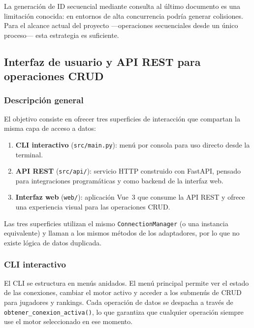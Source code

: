 \documentclass[12pt,letterpaper]{article}
\begin{document}
La generación de ID secuencial mediante consulta al último documento es una limitación
conocida: en entornos de alta concurrencia podría generar colisiones. Para el alcance actual
del proyecto ---operaciones secuenciales desde un único proceso--- esta estrategia es
suficiente.

\subsection{Interfaz de usuario y API REST para operaciones CRUD}

\subsubsection{Descripción general}

El objetivo consiste en ofrecer tres superficies de interacción que compartan
la misma capa de acceso a datos:

\begin{enumerate}[leftmargin=2em]
  \item \textbf{CLI interactivo} (\texttt{src/main.py}): menú por consola para uso directo
        desde la terminal.
  \item \textbf{API REST} (\texttt{src/api/}): servicio HTTP construido con FastAPI, pensado
        para integraciones programáticas y como backend de la interfaz web.
  \item \textbf{Interfaz web} (\texttt{web/}): aplicación Vue~3 que consume la API REST y
        ofrece una experiencia visual para las operaciones CRUD.
\end{enumerate}

Las tres superficies utilizan el mismo \texttt{ConnectionManager} (o una instancia equivalente)
y llaman a los mismos métodos de los adaptadores, por lo que no existe lógica de datos duplicada.

\subsubsection{CLI interactivo}

El CLI se estructura en menús anidados. El menú principal permite ver el estado de las
conexiones, cambiar el motor activo y acceder a los submenús de CRUD para jugadores y
rankings. Cada operación de datos se despacha a través de \texttt{obtener\_conexion\_activa()},
lo que garantiza que cualquier operación siempre use el motor seleccionado en ese momento.
\end{document}
